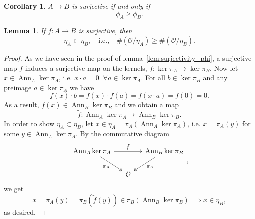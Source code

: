 \documentclass{article}
\theoremstyle{plain}%
\newtheorem{lemma}{Lemma}[section]
\newtheorem{corollary}{Corollary}[section]
\theoremstyle{definition}
\theoremstyle{remark}
\newcommand{\ann}{\operatorname{Ann}}
\begin{document}
    \begin{corollary}\label{cor:surjectivity_phi}
        \(A \to B\) is surjective if and only if \[\phi_A \geq \phi_B.\]
    \end{corollary}

    \begin{lemma}
        If \(f \colon A \to B\) is surjective, then
        \begin{equation}
            \eta_A \subset \eta_B, \quad \text{i.e.,}\quad \#(\mathcal{O}/\eta_A) \geq \#(\mathcal{O}/\eta_B).  
        \end{equation}
    \end{lemma}
    \begin{proof}
        As we have seen in the proof of lemma~\ref{lem:surjectivity_phi}, a surjective map \(f\) induces a surjective
        map on the kernels, \(f\colon \ker \pi_A \to \ker\pi_B\).
        Now let \(x \in \ann_A \ker \pi_A\), i.e. \(x \cdot a = 0\;\; \forall a \in \ker \pi_A\).
        For all \(b \in \ker \pi_B\) and any preimage \(a \in \ker \pi_A\) we have
        \[
            f(x) \cdot b = f(x) \cdot f(a) = f(x \cdot a) = f(0) = 0.
        \]
        As a result, \(f(x) \in \ann_B\ker \pi_B\) and we obtain a map
        \[
            \tilde f\colon\ann_A\ker \pi_A \to \ann_B \ker \pi_B.  
        \]
        In order to show \(\eta_A \subset \eta_B\), let \(x \in \eta_A = \pi_A(\ann_A \ker \pi_A)\), i.e.
        \(x = \pi_A(y)\) for some \(y \in \ann_A \ker \pi_A\). By the commutative diagram
        \[
        \begin{tikzcd}[column sep=small]
            \ann_A \ker \pi_A \arrow[rr, "\tilde f"] \arrow [dr, "\pi_A", swap, twoheadrightarrow] 
            & & \ann_B \ker \pi_B \arrow [dl, "\pi_B", twoheadrightarrow]\\
            & \mathcal{O} &
        \end{tikzcd},
        \]
        we get
        \[
            x = \pi_A(y) = \pi_B(\tilde f(y)) \in \pi_B(\ann_B \ker \pi_B) \implies x \in \eta_B,
        \]
        as desired.
    \end{proof}
\end{document}
